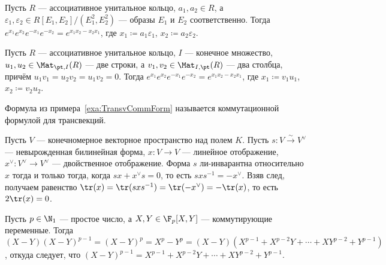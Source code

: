 \documentclass[
	extrafontsizes,
	11pt,
	hyphens,
]{memoir}
\begin{document}

\begin{example}
Пусть \(R\) --- ассоциативное унитальное кольцо, \(a_1, a_2 \in R\), а \(\varepsilon_1, \varepsilon_2 \in R[E_1, E_2] / (E_1^2, E_2^2)\) --- образы \(E_1\) и \(E_2\) соответственно.
Тогда \(e^{x_1} e^{x_2} e^{-x_1} e^{-x_2} = e^{x_1 x_2 - x_2 x_1}\), где \(x_1 \coloneqq a_1 \varepsilon_1\), \(x_2 \coloneqq a_2 \varepsilon_2\).
\end{example}

\begin{example}
Пусть \(R\) --- ассоциативное унитальное кольцо,
\(I\) --- конечное множество,
\(u_1, u_2 \in \Mat_{\pt, I}(R)\) --- две строки,
а \(v_1, v_2 \in \Mat_{I, \pt}(R)\) --- два столбца,
причём \(u_1 v_1 = u_2 v_2 = u_1 v_2 = 0\).%
\label{exa:TransvCommForm}
Тогда \(e^{x_1} e^{x_2} e^{-x_1} e^{-x_2} = e^{x_1 x_2 - x_2 x_1}\), где \(x_1 \coloneqq v_1 u_1\), \(x_2 \coloneqq v_2 u_2\).
\end{example}

\begin{remark}
Формула из примера~\ref{exa:TransvCommForm} называется коммутационной формулой для трансвекций.
\end{remark}

\begin{observation}
Пусть \(V\) --- конечномерное векторное пространство над полем \(K\). Пусть \(s : V \xrightarrow{\sim} V^{\vee}\) --- невырожденная билинейная форма, \(x : V \to V\) --- линейное отображение, \(x^{\vee} : V^{\vee} \to V^{\vee}\) --- двойственное отображение.
\label{obs:tr_lie_bilin}
Форма \(s\) ли-инварантна относительно \(x\) тогда и только тогда, когда
\(s x + x^{\vee} s = 0\),
то есть
\(sxs^{-1} = -x^{\vee}\). Взяв след, получаем
равенство
\(
\tr(x) = \tr(sxs^{-1}) = \tr(-x^{\vee}) = -\tr(x)
\), то есть \(2\tr(x) = 0\).
\end{observation}


\begin{observation}
Пусть \(p \in \N_1\) --- простое число, а \(X, Y \in \F_p[X,Y]\) --- коммутирующие переменные.%
\label{obs:FrobEndCor}
Тогда \((X - Y)(X - Y)^{p-1} = (X - Y)^p = X^p - Y^p = (X - Y)(X^{p-1} + X^{p-2}Y + \cdots{} + XY^{p-2} + Y^{p-1})\),
откуда следует, что \((X - Y)^{p-1} = X^{p-1} + X^{p-2}Y + \cdots{} + XY^{p-2} + Y^{p-1}\).
\end{observation}
\end{document}
